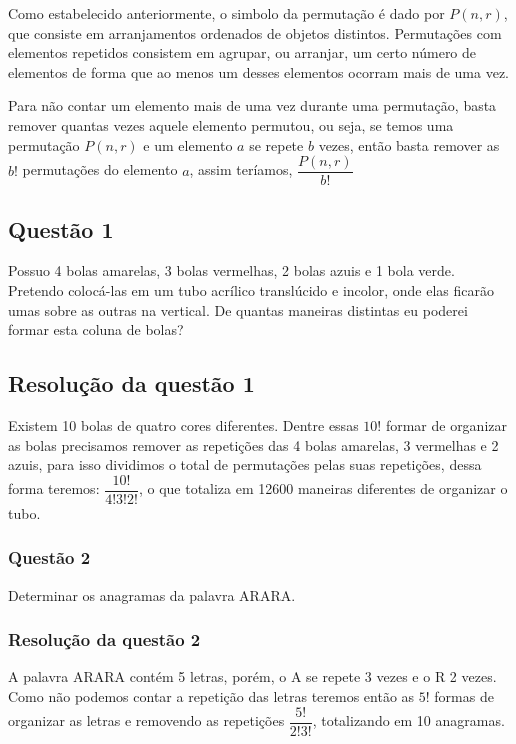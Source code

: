 Como estabelecido anteriormente, o simbolo da permutação é dado por $P(n,r)$, que consiste em arranjamentos ordenados de objetos distintos. Permutações com elementos repetidos consistem em agrupar, ou arranjar, um certo número de elementos de forma que ao menos um desses elementos ocorram mais de uma vez.

Para não contar um elemento mais de uma vez durante uma permutação, basta remover quantas vezes aquele elemento permutou, ou seja, se temos uma permutação $P(n,r)$ e um elemento $a$ se repete $b$ vezes, então basta remover as $b!$ permutações do elemento $a$, assim teríamos, $\dfrac{P(n,r)}{b!}$


\subsection*{Questão 1}
Possuo 4 bolas amarelas, 3 bolas vermelhas, 2 bolas azuis e 1 bola verde. Pretendo colocá-las em um tubo acrílico translúcido e incolor, onde elas ficarão umas sobre as outras na vertical. De quantas maneiras distintas eu poderei formar esta coluna de bolas?

\subsection*{Resolução da questão 1}

Existem 10 bolas de quatro cores diferentes. Dentre essas $10!$ formar de organizar as bolas precisamos remover as repetições das 4 bolas amarelas, 3 vermelhas e 2 azuis, para isso dividimos o total de permutações pelas suas repetições, dessa forma teremos: $\dfrac{10!}{4! 3! 2!}$, o que totaliza em 12600 maneiras diferentes de organizar o tubo.

\subsubsection*{Questão 2}

Determinar os anagramas da palavra ARARA. 

\subsubsection*{Resolução da questão 2}

A palavra ARARA contém 5 letras, porém, o A se repete 3 vezes e o R 2 vezes. Como não podemos contar a repetição das letras teremos então as $5!$ formas de organizar as letras e removendo as repetições $\dfrac{5!}{2! 3!}$, totalizando em 10 anagramas.

